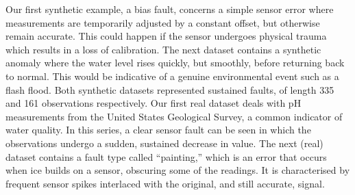 \documentclass{article} %
\begin{document}
Our first synthetic example, a bias fault, concerns a simple sensor
error where measurements are temporarily adjusted by a constant
offset, but otherwise remain accurate. This could happen if the sensor
undergoes physical trauma which results in a loss of calibration.
The next dataset contains a synthetic anomaly where the water level
rises quickly, but smoothly, before returning back to normal. This
would be indicative of a genuine environmental event such as a flash
flood. Both synthetic datasets represented sustained faults, of length 335 and 161 observations respectively.
Our first real dataset deals with pH measurements from the United States Geological Survey, a common indicator of water quality. In this series, a clear sensor fault can be seen
in which the observations undergo a sudden, sustained decrease in value.
The next (real) dataset contains a fault type called ``painting,'' which is
an error that occurs when ice builds on a sensor, obscuring some of the
readings. It is characterised by frequent sensor spikes interlaced
with the original, and still accurate, signal.

\end{document}
